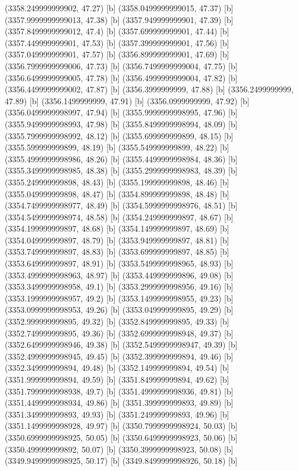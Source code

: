 {{{(3358.249999999902, 47.27) [b] 
(3358.0499999999015, 47.37) [b] 
(3357.9999999999013, 47.38) [b] 
(3357.949999999901, 47.39) [b] 
(3357.8499999999012, 47.4) [b] 
(3357.699999999901, 47.44) [b] 
(3357.449999999901, 47.53) [b] 
(3357.399999999901, 47.56) [b] 
(3357.049999999901, 47.57) [b] 
(3356.899999999901, 47.69) [b] 
(3356.7999999999006, 47.73) [b] 
(3356.7499999999004, 47.75) [b] 
(3356.6499999999005, 47.78) [b] 
(3356.4999999999004, 47.82) [b] 
(3356.4499999999002, 47.87) [b] 
(3356.3999999999, 47.88) [b] 
(3356.2499999999, 47.89) [b] 
(3356.1499999999, 47.91) [b] 
(3356.0999999999, 47.92) [b] 
(3356.0499999998997, 47.94) [b] 
(3355.9999999998995, 47.96) [b] 
(3355.9499999998993, 47.98) [b] 
(3355.8499999998994, 48.09) [b] 
(3355.7999999998992, 48.12) [b] 
(3355.699999999899, 48.15) [b] 
(3355.599999999899, 48.19) [b] 
(3355.549999999899, 48.22) [b] 
(3355.4999999998986, 48.26) [b] 
(3355.4499999998984, 48.36) [b] 
(3355.3499999998985, 48.38) [b] 
(3355.2999999998983, 48.39) [b] 
(3355.249999999898, 48.43) [b] 
(3355.199999999898, 48.46) [b] 
(3355.049999999898, 48.47) [b] 
(3354.899999999898, 48.48) [b] 
(3354.7499999998977, 48.49) [b] 
(3354.5999999998976, 48.51) [b] 
(3354.5499999998974, 48.58) [b] 
(3354.249999999897, 48.67) [b] 
(3354.199999999897, 48.68) [b] 
(3354.149999999897, 48.69) [b] 
(3354.049999999897, 48.79) [b] 
(3353.949999999897, 48.81) [b] 
(3353.749999999897, 48.83) [b] 
(3353.699999999897, 48.85) [b] 
(3353.649999999897, 48.91) [b] 
(3353.5499999998965, 48.93) [b] 
(3353.4999999998963, 48.97) [b] 
(3353.449999999896, 49.08) [b] 
(3353.3499999998958, 49.1) [b] 
(3353.2999999998956, 49.16) [b] 
(3353.1999999998957, 49.2) [b] 
(3353.1499999998955, 49.23) [b] 
(3353.0999999998953, 49.26) [b] 
(3353.049999999895, 49.29) [b] 
(3352.999999999895, 49.32) [b] 
(3352.849999999895, 49.33) [b] 
(3352.749999999895, 49.36) [b] 
(3352.6999999998948, 49.37) [b] 
(3352.6499999998946, 49.38) [b] 
(3352.5499999998947, 49.39) [b] 
(3352.4999999998945, 49.45) [b] 
(3352.399999999894, 49.46) [b] 
(3352.349999999894, 49.48) [b] 
(3352.149999999894, 49.54) [b] 
(3351.999999999894, 49.59) [b] 
(3351.849999999894, 49.62) [b] 
(3351.7999999998938, 49.7) [b] 
(3351.4999999998936, 49.81) [b] 
(3351.4499999998934, 49.86) [b] 
(3351.399999999893, 49.89) [b] 
(3351.349999999893, 49.93) [b] 
(3351.249999999893, 49.96) [b] 
(3351.1499999998928, 49.97) [b] 
(3350.7999999998924, 50.03) [b] 
(3350.6999999998925, 50.05) [b] 
(3350.6499999998923, 50.06) [b] 
(3350.499999999892, 50.07) [b] 
(3350.3999999998923, 50.08) [b] 
(3349.9499999998925, 50.17) [b] 
(3349.8499999998926, 50.18) [b] 
}}}
